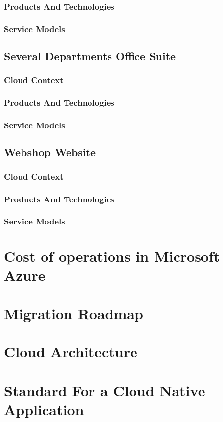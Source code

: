 \documentclass{llncs}
\begin{document}
\subsubsection{Products And Technologies}
\subsubsection{Service Models}

\subsection{Several Departments	Office Suite}
\subsubsection{Cloud Context}
\subsubsection{Products And Technologies}
\subsubsection{Service Models}

\subsection{Webshop	Website}
\subsubsection{Cloud Context}
\subsubsection{Products And Technologies}
\subsubsection{Service Models}


\section{Cost of operations in Microsoft Azure}

\section{Migration Roadmap}

\section{Cloud Architecture}

\section{Standard For a Cloud Native Application}



\begin{thebibliography}{5}

   

\end{thebibliography}
\end{document}
